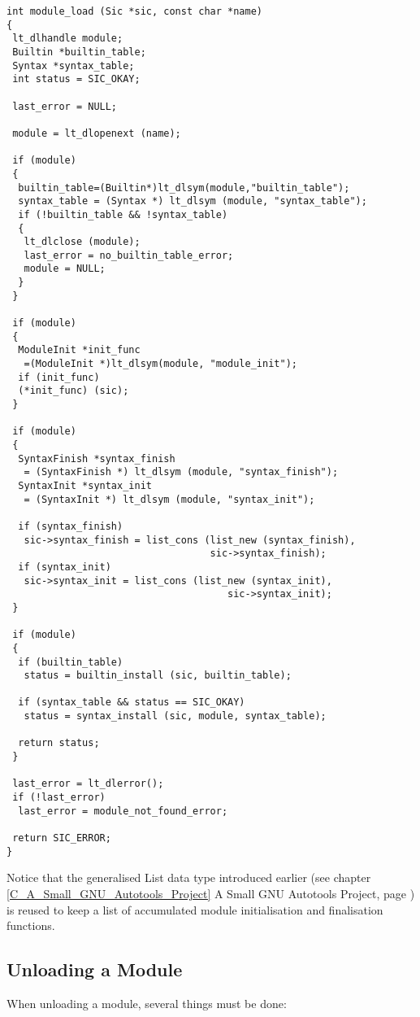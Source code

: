 \begin{Verbatim}[frame=single]
int module_load (Sic *sic, const char *name)
{
 lt_dlhandle module;
 Builtin *builtin_table;
 Syntax *syntax_table;
 int status = SIC_OKAY;

 last_error = NULL;

 module = lt_dlopenext (name);

 if (module)
 {
  builtin_table=(Builtin*)lt_dlsym(module,"builtin_table");
  syntax_table = (Syntax *) lt_dlsym (module, "syntax_table");
  if (!builtin_table && !syntax_table)
  {
   lt_dlclose (module);
   last_error = no_builtin_table_error;
   module = NULL;
  }
 }

 if (module)
 {
  ModuleInit *init_func
   =(ModuleInit *)lt_dlsym(module, "module_init");
  if (init_func)
  (*init_func) (sic);
 }

 if (module)
 {
  SyntaxFinish *syntax_finish
   = (SyntaxFinish *) lt_dlsym (module, "syntax_finish");
  SyntaxInit *syntax_init
   = (SyntaxInit *) lt_dlsym (module, "syntax_init");

  if (syntax_finish)
   sic->syntax_finish = list_cons (list_new (syntax_finish),
                                   sic->syntax_finish);
  if (syntax_init)
   sic->syntax_init = list_cons (list_new (syntax_init),
                                      sic->syntax_init);
 }

 if (module)
 {
  if (builtin_table)
   status = builtin_install (sic, builtin_table);

  if (syntax_table && status == SIC_OKAY)
   status = syntax_install (sic, module, syntax_table);

  return status;
 }

 last_error = lt_dlerror();
 if (!last_error)
  last_error = module_not_found_error;

 return SIC_ERROR;
}
\end{Verbatim}

Notice that the generalised List data type introduced earlier
(see chapter \ref{C_A_Small_GNU_Autotools_Project}
A Small GNU Autotools Project, page \pageref{C_A_Small_GNU_Autotools_Project})
is reused to keep a list of accumulated module initialisation and finalisation functions.

\subsection{Unloading a Module}

When unloading a module, several things must be done: 

